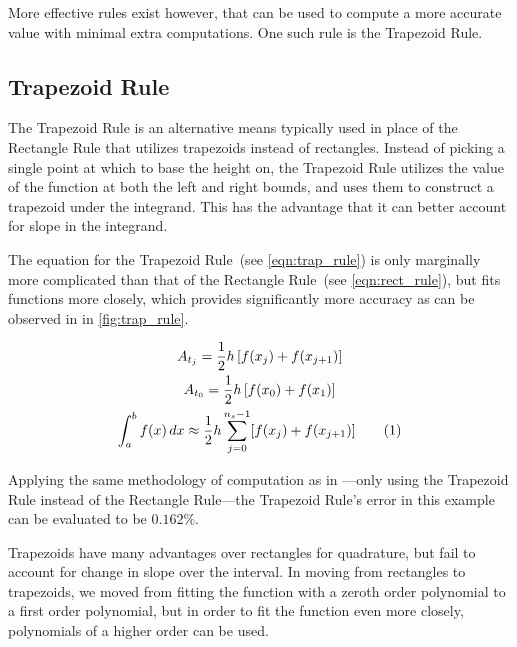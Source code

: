 \documentclass{paper}
\begin{document}
More effective rules exist however, that can be used to compute a more accurate value with minimal extra computations.
One such rule is the Trapezoid Rule.

\subsection{Trapezoid Rule}
\label{sec:trap_rule}
The Trapezoid Rule is an alternative means typically used in place of the Rectangle Rule that utilizes trapezoids instead of rectangles.
Instead of picking a single point at which to base the height on, the Trapezoid Rule utilizes the value of the function at both the left and right bounds, and uses them to construct a trapezoid under the integrand.
This has the advantage that it can better account for slope in the integrand.\autocite{num_methods}

The equation for the Trapezoid Rule~(see \cref{eqn:trap_rule}) is only marginally more complicated than that of the Rectangle Rule~(see \cref{eqn:rect_rule}), but fits functions more closely, which provides significantly more accuracy as can be observed in in \cref{fig:trap_rule}.

\begin{gather*}
    A_{t_{j}} = \frac{1}{2} h \left[ f(x_{j}) + f(x_{j+1}) \right]                                                                                                \\
    A_{t_{0}} = \frac{1}{2} h \left[f(x_0) + f(x_1)\right]                                                                  \\
    \int_a^b f(x) \,dx \approx \frac{1}{2}h \sum^{n_s-1}_{j=0}[f(x_{j}) + f(x_{j+1})] \tageq\label{eqn:trap_rule} 
\end{gather*}



Applying the same methodology of computation as in ---only using the Trapezoid Rule instead of the Rectangle Rule---the Trapezoid Rule's error in this example can be evaluated to be \(0.162\%\).

Trapezoids have many advantages over rectangles for quadrature, but fail to account for change in slope over the interval.
In moving from rectangles to trapezoids, we moved from fitting the function with a zeroth order polynomial to a first order polynomial, but in order to fit the function even more closely, polynomials of a higher order can be used.
\end{document}

